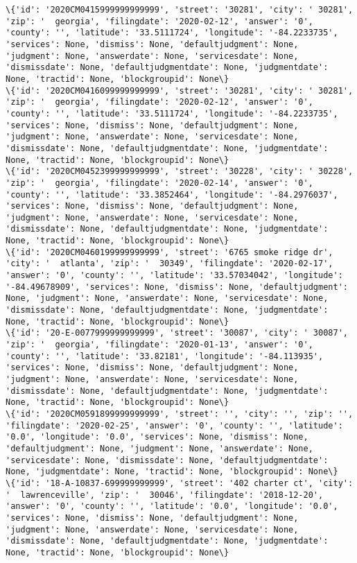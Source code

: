 \documentclass[11pt]{article}
\begin{document}
\begin{Verbatim}[commandchars=\\\{\}]
\{'id': '2020CM0415999999999999', 'street': '30281', 'city': ' 30281', 'zip': '  georgia', 'filingdate': '2020-02-12', 'answer': '0', 'county': '', 'latitude': '33.5111724', 'longitude': '-84.2233735', 'services': None, 'dismiss': None, 'defaultjudgment': None, 'judgment': None, 'answerdate': None, 'servicesdate': None, 'dismissdate': None, 'defaultjudgmentdate': None, 'judgmentdate': None, 'tractid': None, 'blockgroupid': None\}
\{'id': '2020CM0416099999999999', 'street': '30281', 'city': ' 30281', 'zip': '  georgia', 'filingdate': '2020-02-12', 'answer': '0', 'county': '', 'latitude': '33.5111724', 'longitude': '-84.2233735', 'services': None, 'dismiss': None, 'defaultjudgment': None, 'judgment': None, 'answerdate': None, 'servicesdate': None, 'dismissdate': None, 'defaultjudgmentdate': None, 'judgmentdate': None, 'tractid': None, 'blockgroupid': None\}
\{'id': '2020CM0452399999999999', 'street': '30228', 'city': ' 30228', 'zip': '  georgia', 'filingdate': '2020-02-14', 'answer': '0', 'county': '', 'latitude': '33.3852464', 'longitude': '-84.2976037', 'services': None, 'dismiss': None, 'defaultjudgment': None, 'judgment': None, 'answerdate': None, 'servicesdate': None, 'dismissdate': None, 'defaultjudgmentdate': None, 'judgmentdate': None, 'tractid': None, 'blockgroupid': None\}
\{'id': '2020CM0460199999999999', 'street': '6765 smoke ridge dr', 'city': '  atlanta', 'zip': '  30349', 'filingdate': '2020-02-17', 'answer': '0', 'county': '', 'latitude': '33.57034042', 'longitude': '-84.49678909', 'services': None, 'dismiss': None, 'defaultjudgment': None, 'judgment': None, 'answerdate': None, 'servicesdate': None, 'dismissdate': None, 'defaultjudgmentdate': None, 'judgmentdate': None, 'tractid': None, 'blockgroupid': None\}
\{'id': '20-E-0077999999999999', 'street': '30087', 'city': ' 30087', 'zip': '  georgia', 'filingdate': '2020-01-13', 'answer': '0', 'county': '', 'latitude': '33.82181', 'longitude': '-84.113935', 'services': None, 'dismiss': None, 'defaultjudgment': None, 'judgment': None, 'answerdate': None, 'servicesdate': None, 'dismissdate': None, 'defaultjudgmentdate': None, 'judgmentdate': None, 'tractid': None, 'blockgroupid': None\}
\{'id': '2020CM0591899999999999', 'street': '', 'city': '', 'zip': '', 'filingdate': '2020-02-25', 'answer': '0', 'county': '', 'latitude': '0.0', 'longitude': '0.0', 'services': None, 'dismiss': None, 'defaultjudgment': None, 'judgment': None, 'answerdate': None, 'servicesdate': None, 'dismissdate': None, 'defaultjudgmentdate': None, 'judgmentdate': None, 'tractid': None, 'blockgroupid': None\}
\{'id': '18-A-10837-699999999999', 'street': '402 charter ct', 'city': '  lawrenceville', 'zip': '  30046', 'filingdate': '2018-12-20', 'answer': '0', 'county': '', 'latitude': '0.0', 'longitude': '0.0', 'services': None, 'dismiss': None, 'defaultjudgment': None, 'judgment': None, 'answerdate': None, 'servicesdate': None, 'dismissdate': None, 'defaultjudgmentdate': None, 'judgmentdate': None, 'tractid': None, 'blockgroupid': None\}

\end{Verbatim}
\end{document}
